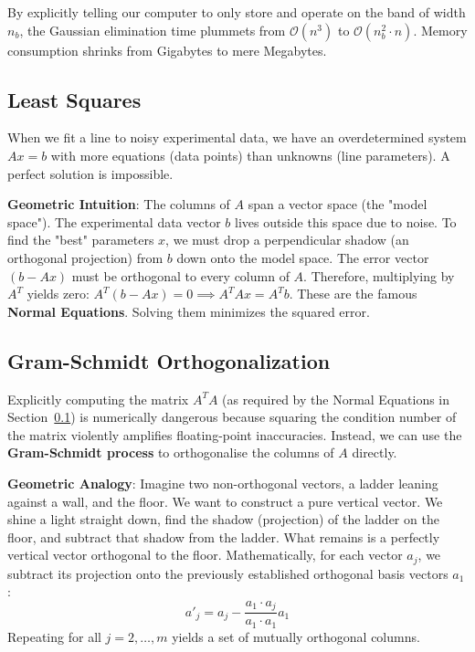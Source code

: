 \documentclass[12pt, a4paper]{article}
\begin{document}
By explicitly telling our computer to only store and operate on the band of width $n_b$, the Gaussian elimination time plummets from $\mathcal{O}(n^3)$ to $\mathcal{O}(n_b^2 \cdot n)$. Memory consumption shrinks from Gigabytes to mere Megabytes.

\subsection{Least Squares}
\label{subsec:leastsquares}
When we fit a line to noisy experimental data, we have an overdetermined system $Ax = b$ with more equations (data points) than unknowns (line parameters). A perfect solution is impossible. 

\textbf{Geometric Intuition}: The columns of $A$ span a vector space (the "model space"). The experimental data vector $b$ lives outside this space due to noise. To find the "best" parameters $x$, we must drop a perpendicular shadow (an orthogonal projection) from $b$ down onto the model space.
The error vector $(b - Ax)$ must be orthogonal to every column of $A$. Therefore, multiplying by $A^T$ yields zero:
$A^T (b - Ax) = 0 \implies A^T A x = A^T b$. 
These are the famous \textbf{Normal Equations}. Solving them minimizes the squared error.

\subsection{Gram-Schmidt Orthogonalization}
\label{subsec:gramschmidt}
Explicitly computing the matrix $A^T A$ (as required by the Normal Equations in Section~\ref{subsec:leastsquares}) is numerically dangerous because squaring the condition number of the matrix violently amplifies floating-point inaccuracies.
Instead, we can use the \textbf{Gram-Schmidt process} to orthogonalise the columns of $A$ directly.

\textbf{Geometric Analogy}: Imagine two non-orthogonal vectors, a ladder leaning against a wall, and the floor. We want to construct a pure vertical vector. We shine a light straight down, find the shadow (projection) of the ladder on the floor, and subtract that shadow from the ladder. What remains is a perfectly vertical vector orthogonal to the floor.
Mathematically, for each vector $a_j$, we subtract its projection onto the previously established orthogonal basis vectors $a_1$:
\begin{equation}
a'_j = a_j - \frac{a_1 \cdot a_j}{a_1 \cdot a_1} a_1
\end{equation}
Repeating for all $j = 2, \ldots, m$ yields a set of mutually orthogonal columns.
\end{document}
